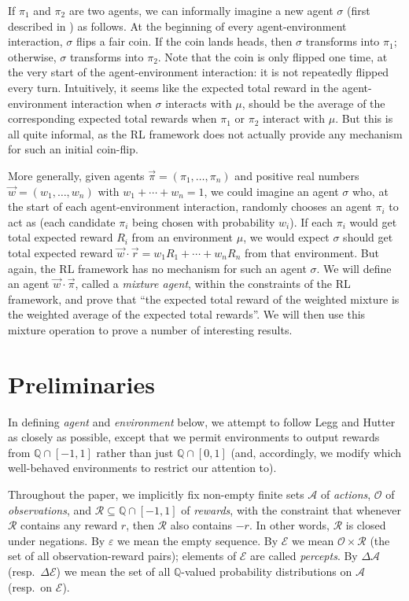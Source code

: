 \documentclass[twoside]{article}
\begin{document}
If $\pi_1$ and $\pi_2$ are two agents, we can informally imagine a new agent
$\sigma$ (first described in \cite{alexander2021reward})
as follows. At the beginning of every agent-environment interaction,
$\sigma$ flips a fair coin. If the coin lands heads, then $\sigma$ transforms into
$\pi_1$; otherwise, $\sigma$ transforms into $\pi_2$. Note that the coin is only
flipped one time, at the very start of the agent-environment interaction:
it is not repeatedly flipped every turn. Intuitively, it seems like the
expected total reward in the agent-environment interaction
when $\sigma$ interacts with $\mu$, should be the average
of the corresponding expected total rewards when $\pi_1$ or $\pi_2$ interact
with $\mu$. But this is all quite informal, as the RL
framework does not actually provide any mechanism for such an initial
coin-flip.

More generally, given agents $\vec{\pi}=(\pi_1,\ldots,\pi_n)$ and positive real
numbers
$\vec{w}=(w_1,\ldots,w_n)$ with $w_1+\cdots+w_n=1$, we could imagine an agent $\sigma$
who, at the start of each agent-environment interaction, randomly chooses
an agent $\pi_i$ to act as (each candidate $\pi_i$ being chosen with probability
$w_i$). If each $\pi_i$ would get total expected reward $R_i$ from an environment
$\mu$, we would expect $\sigma$ should get total expected reward
$\vec{w}\cdot \vec{r}=w_1R_1+\cdots+w_nR_n$ from that environment.
But again, the RL
framework has no mechanism for such an agent $\sigma$. We will define
an agent $\vec{w}\cdot\vec{\pi}$, called a \emph{mixture agent},
within the constraints
of the RL framework, and prove that ``the expected total reward of the
weighted mixture is the weighted average of the expected total rewards''.
We will then use this mixture operation to prove a number of interesting results.

\section{Preliminaries}

In defining \emph{agent} and \emph{environment} below, we attempt to follow
Legg and Hutter \cite{legg2007universal} as closely as possible,
except that we permit environments to output rewards from $\mathbb Q \cap [-1,1]$
rather than just $\mathbb Q\cap [0,1]$ (and, accordingly, we modify which well-behaved
environments to restrict our attention to).

Throughout the paper, we implicitly
fix non-empty finite sets $\mathcal A$ of \emph{actions},
$\mathcal O$ of \emph{observations},
and $\mathcal R\subseteq \mathbb Q\cap [-1,1]$ of \emph{rewards},
with the constraint that
whenever $\mathcal R$ contains any reward $r$, then $\mathcal R$
also contains $-r$. In other words, $\mathcal R$ is closed under negations.
By $\varepsilon$ we mean the empty sequence.
By $\mathcal E$ we mean $\mathcal O\times\mathcal R$ (the set of all observation-reward
pairs); elements of $\mathcal E$ are called \emph{percepts}.
By $\Delta\mathcal A$ (resp.\ $\Delta\mathcal E$) we mean the set of all $\mathbb Q$-valued
probability distributions on $\mathcal A$ (resp.\ on $\mathcal E$).
\end{document}
